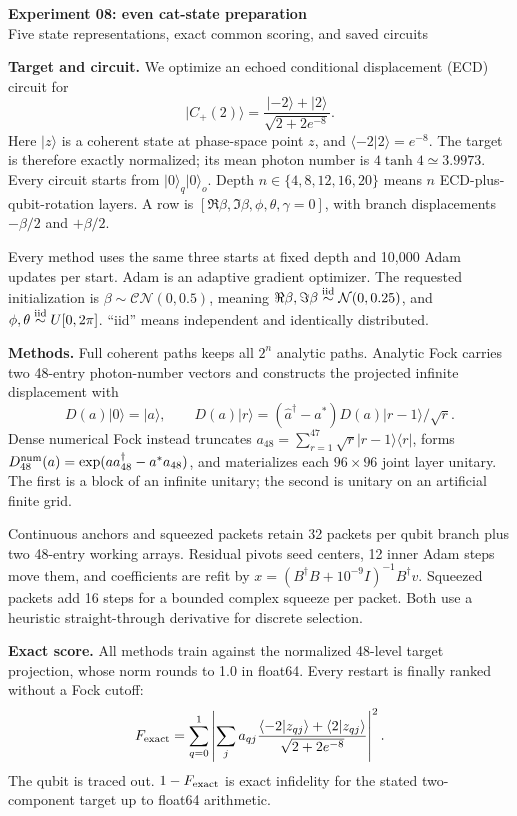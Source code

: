 \documentclass[10pt]{article}
\newcommand{\ket}[1]{\lvert #1\rangle}
\newcommand{\bra}[1]{\langle #1\rvert}
\begin{document}
\begin{center}
{\Large\bfseries Experiment 08: even cat-state preparation}\\[-1pt]
{\small Five state representations, exact common scoring, and saved circuits}
\end{center}

\textbf{Target and circuit.}
We optimize an echoed conditional displacement (ECD) circuit for
\[
\ket{C_+(2)}=\frac{\ket{-2}+\ket2}{\sqrt{2+2e^{-8}}}.
\]
Here \(\ket z\) is a coherent state at phase-space point \(z\), and
\(\langle-2|2\rangle=e^{-8}\). The target is therefore exactly normalized;
its mean photon number is \(4\tanh4\simeq3.9973\). Every circuit starts from
\(\ket0_q\ket0_o\). Depth \(n\in\{4,8,12,16,20\}\) means \(n\)
ECD-plus-qubit-rotation layers. A row is
\([\Re\beta,\Im\beta,\phi,\theta,\gamma=0]\), with branch displacements
\(-\beta/2\) and \(+\beta/2\).

Every method uses the same three starts at fixed depth and 10,000 Adam updates
per start. Adam is an adaptive gradient optimizer. The requested initialization
is \(\beta\sim\mathcal{CN}(0,0.5)\), meaning
\(\Re\beta,\Im\beta\stackrel{\rm iid}{\sim}\mathcal N(0,0.25)\), and
\(\phi,\theta\stackrel{\rm iid}{\sim}U[0,2\pi]\). ``iid'' means independent
and identically distributed.

\textbf{Methods.}
Full coherent paths keeps all \(2^n\) analytic paths. Analytic Fock carries
two 48-entry photon-number vectors and constructs the projected infinite
displacement with
\[
D(a)\ket0=\ket a,\qquad
D(a)\ket r=(\hat a^\dagger-a^*)D(a)\ket{r-1}/\sqrt r.
\]
Dense numerical Fock instead truncates
\(a_{48}=\sum_{r=1}^{47}\sqrt r\ket{r-1}\!\bra r\), forms
\(D^{\rm num}_{48}(a)=\exp(a a_{48}^\dagger-a^*a_{48})\), and materializes
each \(96\times96\) joint layer unitary. The first is a block of an infinite
unitary; the second is unitary on an artificial finite grid.

Continuous anchors and squeezed packets retain 32 packets per qubit branch
plus two 48-entry working arrays. Residual pivots seed centers, 12 inner Adam
steps move them, and coefficients are refit by
\(x=(B^\dagger B+10^{-9}I)^{-1}B^\dagger v\). Squeezed packets add 16 steps
for a bounded complex squeeze per packet. Both use a heuristic straight-through
derivative for discrete selection.

\textbf{Exact score.}
All methods train against the normalized 48-level target projection, whose norm
rounds to 1.0 in float64. Every restart is finally ranked without a Fock cutoff:
\[
F_{\rm exact}=\sum_{q=0}^1\left|\sum_j a_{qj}
\frac{\langle-2|z_{qj}\rangle+\langle2|z_{qj}\rangle}
{\sqrt{2+2e^{-8}}}\right|^2.
\]
The qubit is traced out. \(1-F_{\rm exact}\) is exact infidelity for the stated
two-component target up to float64 arithmetic.
\end{document}
